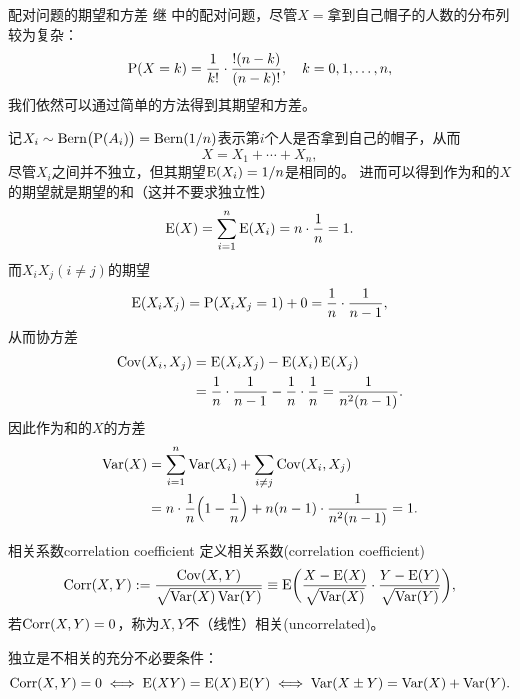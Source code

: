 \begin{example}{配对问题的期望和方差}{}
	继 中的配对问题，尽管$X =$拿到自己帽子的人数的分布列较为复杂：
	\begin{equation}
		\P(X = k) = \frac1{k!} \cdot \frac{!(n - k)}{(n - k)!},\quad k = 0,1,\ldots,n,
	\end{equation}
	我们依然可以通过简单的方法得到其期望和方差。
	
	记$X_i \sim \BernDist\bigp{\P(A_i)} = \BernDist(1/n)$表示第$i$个人是否拿到自己的帽子，从而
	\[
		X = X_1 + \cdots + X_n,
	\]
	尽管$X_i$之间并不独立，但其期望$\E(X_i) = 1/n$是相同的。
	进而可以得到作为和的$X$的期望就是期望的和（这并不要求独立性）
	\begin{equation}
		\E(X) = \sum_{i=1}^n\E(X_i) = n \cdot \frac1n = 1.
	\end{equation}
	而$X_iX_j(i \neq j)$的期望
	\[
		\E(X_iX_j) = \P(X_iX_j = 1) + 0 = \frac1n \cdot \frac1{n - 1},
	\]
	从而协方差
	\begin{equation}
		\begin{aligned}
			\Cov(X_i,X_j) &= \E(X_iX_j) - \E(X_i)\E(X_j)\\
			&= \frac1n \cdot \frac1{n - 1} - \frac1n \cdot \frac1n = \frac1{n^2(n - 1)}.
		\end{aligned}
	\end{equation}
	因此作为和的$X$的方差
	\begin{equation}
		\begin{aligned}
			\Var(X) &= \sum_{i=1}^n\Var(X_i) + \sum_{i\neq j}\Cov(X_i,X_j)\\
			&= n \cdot \frac1n\Bigp{1 - \frac1n} + n(n - 1) \cdot \frac1{n^2(n - 1)} = 1.
		\end{aligned}
	\end{equation}
\end{example}
\begin{definition}{相关系数}{correlation coefficient}
	定义相关系数(correlation coefficient)
	\begin{equation}
		\Corr(X,Y) := \frac{\Cov(X,Y)}{\sqrt{\Var(X)\Var(Y)}} \equiv \E\biggp{\frac{X - \E(X)}{\sqrt{\Var(X)}} \cdot \frac{Y - \E(Y)}{\sqrt{\Var(Y)}}},
	\end{equation}
	若$\Corr(X,Y) = 0$，称为$X,Y$不（线性）相关(uncorrelated)。
\end{definition}

\begin{corollary}
	独立是不相关的充分不必要条件：
	\begin{equation}
		\Corr(X,Y) = 0
		\iff \E(XY) = \E(X)\E(Y)
		\iff \Var(X \pm Y) = \Var(X) + \Var(Y).
	\end{equation}
\end{corollary}


